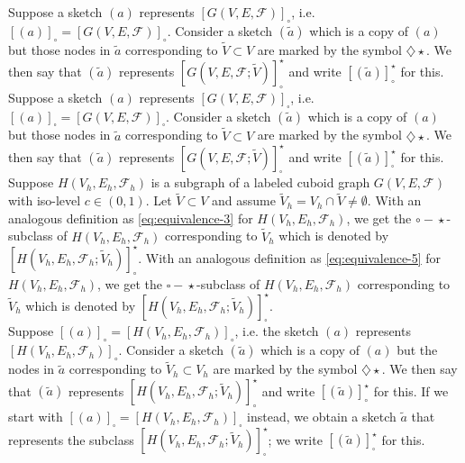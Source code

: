 \documentclass[a4paper,11pt]{article}
\begin{document}
Suppose a sketch $(a)$ represents
$[G(V,E,\mathcal{F})]_{\circ}$, i.e. $[(a)]_{\circ}=[G(V,E,\mathcal{F})]_{\circ}$. Consider a sketch
$(\tilde{a})$ which is a copy of $(a)$ but those nodes in $\tilde{a}$ corresponding to $\tilde{V}\subset V$
are marked by the symbol $\diamondsuit\!\!\!\!\star$. We then say that $(\tilde{a})$ represents $[G(V,E,
\mathcal{F};\tilde{V})]_{\circ}^{\star}$ and write $[(\tilde{a})]_{\circ}^{\star}$ for this. \\

Suppose a sketch $(a)$ represents
$[G(V,E,\mathcal{F})]_{\square}$, i.e. $[(a)]_{\square}=[G(V,E,\mathcal{F})]_{\square}$. Consider a sketch
$(\tilde{a})$ which is a copy of $(a)$ but those nodes in $\tilde{a}$ corresponding to $\tilde{V}\subset V$
are marked by the symbol $\diamondsuit\!\!\!\!\star$. We then say that $(\tilde{a})$ represents
$[G(V,E,\mathcal{F};\tilde{V})]_{\square}^{\star}$ and write $[(\tilde{a})]_{\square}^{\star}$ for this. \\

Suppose $H(V_h,E_h,\mathcal{F}_h)$
is a subgraph of a labeled cuboid graph $G(V,E,\mathcal{F})$ with iso-level $c\in (0,1)$. Let $\tilde{V}\subset V$
and assume $\tilde{V}_h=V_h\cap \tilde{V}\neq\emptyset$. With an analogous definition as \eqref{eq:equivalence-3}
for $H(V_h,E_h,\mathcal{F}_h)$, we get the  $\circ\!-\!\star$-subclass of $H(V_h,E_h,\mathcal{F}_h)$ corresponding
to $\tilde{V}_h$ which is denoted by $[H(V_h,E_h,\mathcal{F}_h;\tilde{V}_h)]_{\circ}^{\star}$. With an analogous
definition as \eqref{eq:equivalence-5} for $H(V_h,E_h,\mathcal{F}_h)$, we get the  $\square\!-\!\star$-subclass of
$H(V_h,E_h,\mathcal{F}_h)$ corresponding to $\tilde{V}_h$ which is denoted by
$[H(V_h,E_h,\mathcal{F}_h;\tilde{V}_h)]_{\square}^{\star}$.\\

Suppose
$[(a)]_{\circ}=[H(V_h,E_h,\mathcal{F}_h)]_{\circ}$, i.e. the sketch $(a)$ represents $[H(V_h,E_h,\mathcal{F}_h)]_{\circ}$.
Consider a sketch $(\tilde{a})$ which is a copy of $(a)$ but the nodes in $\tilde{a}$ corresponding to
$\tilde{V}_h\subset V_h$ are marked by the symbol $\diamondsuit\!\!\!\!\star$. We then say that $(\tilde{a})$ represents
$[H(V_h,E_h,\mathcal{F}_h;\tilde{V}_h)]_{\circ}^{\star}$ and write $[(\tilde{a})]_{\circ}^{\star}$ for this. If we start
with $[(a)]_{\square}=[H(V_h,E_h,\mathcal{F}_h)]_{\square}$ instead, we obtain a sketch $\tilde{a}$ that represents
the subclass $[H(V_h,E_h,\mathcal{F}_h;\tilde{V}_h)]_{\square}^{\star}$; we write $[(\tilde{a})]_{\square}^{\star}$ for this.\\
\end{document}

